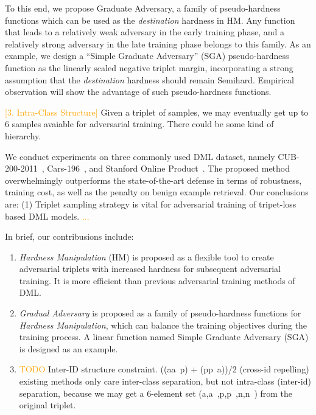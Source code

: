 \documentclass[10pt,twocolumn,letterpaper]{article}
\newcommand{\oo}[1]{\textcolor{orange}{#1}}
\begin{document}

To this end, we propose Graduate Adversary, a family of pseudo-hardness
functions which can be used as the \emph{destination} hardness in HM.
%
Any function that leads to a relatively weak adversary in the early training
phase, and a relatively strong adversary in the late training phase belongs to
this family.
%
As an example, we design a ``Simple Graduate Adversary'' (SGA) pseudo-hardness
function as the linearly scaled negative triplet margin, incorporating a strong
assumption that the \emph{destination} hardness should remain Semihard.
%
Empirical observation will show the advantage of such pseudo-hardness
functions.

\oo{[3. Intra-Class Structure]}
Given a triplet of samples, we may eventually get up to 6 samples avaiable
for adversarial training. There could be some kind of hierarchy.

We conduct experiments
on three commonly used DML dataset, namely CUB-200-2011~\cite{cub200}, Cars-196~\cite{cars196}, and Stanford
Online Product~\cite{sop}.
%
The proposed method overwhelmingly outperforms the state-of-the-art defense
in terms of robustness, training cost, as well as the penalty on benign
example retrieval.
%
Our conclusions are:
%
(1) Triplet sampling strategy is vital for adversarial training of tripet-loss
based DML models.
%
\oo{...}


In brief, our contribusions include:
%
\begin{enumerate}[nosep, noitemsep, leftmargin=*]
	\item {\textit{Hardness Manipulation}} (HM) is proposed as a flexible tool
		to create adversarial triplets with increased hardness for
		subsequent adversarial training.
		It is more efficient than previous adversarial training methods of DML.
	\item \textit{Gradual Adversary} is proposed as a family of pseudo-hardness
		functions for \emph{Hardness Manipulation}, which can balance the
		training objectives during the training process.
		A linear function named Simple Graduate Adversary (SGA) is designed as
		an example.
	\item \oo{TODO} Inter-ID structure constraint. ((aa~p) + (pp~a))/2
		(cross-id repelling) existing methods only care inter-class separation,
		but not intra-class (inter-id) separation, because we may get a
		6-element set (a,a~,p,p~,n,n~) from the original triplet.
\end{enumerate}
\end{document}
